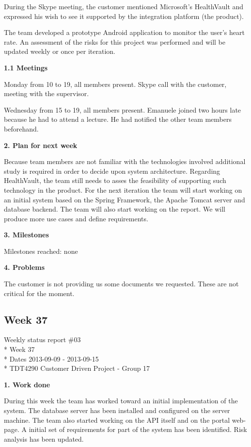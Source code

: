 During the Skype meeting, the customer mentioned Microsoft’s  HealthVault and expressed his wish to
see it supported by the integration platform (the product).

The team developed a prototype Android application to monitor the user’s heart rate. An assessment
of the risks for this project was performed and will be updated weekly or once per iteration.

\textbf{1.1 Meetings}

Monday
from 10 to 19, all members present.
Skype call with the customer, meeting with the supervisor.

Wednesday
from 15 to 19, all members present. Emanuele joined two hours late because he had to attend a lecture. 
He had notified the other team members beforehand.

\textbf{2. Plan for next week}

Because team members are not familiar with the technologies involved  additional study is required in order
to decide upon system architecture.
Regarding HealthVault, the team still needs to asses the feasibility of supporting such technology in the product. 
For the next iteration the team will start working on an initial system based on the Spring Framework, the
Apache Tomcat server and database backend.  The team will also start working on the report. 
We will produce more use cases and define requirements.

\textbf{3. Milestones}

Milestones reached: none

\textbf{4. Problems}

The customer is not providing us some documents we requested.
These are not critical for the moment.

\newpage
\subsection{Week 37}

\begin{center}
Weekly status report \#03\\*
Week 37 \\*
Dates 2013-09-09 - 2013-09-15 \\*
TDT4290 Customer Driven Project - Group 17
\end{center}

\textbf{1. Work done}

During this week the team has worked toward an initial implementation of the system. 
The database server has been installed and configured on the server machine. The team also started
working on the API itself and on the portal web-page. 
A initial set of requirements for part of the system has been identified. Risk analysis has been updated.

